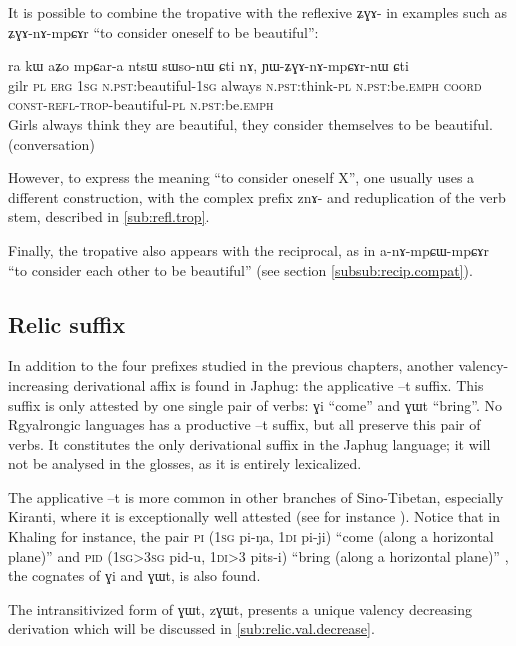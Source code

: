 \documentclass[oldfontcommands,oneside,a4paper,11pt]{memoir}
\newcommand{\ipa}[1]{{\phon #1}} %
\newcommand{\coord}{\textsc{coord}}
\newcommand{\const}{\textsc{const}}
\newcommand{\erg}{\textsc{erg}}
\newcommand{\emphat}{\textsc{emph}}
\newcommand{\npst}{\textsc{n.pst}}
\newcommand{\pl}{\textsc{pl}}
\newcommand{\refl}{\textsc{refl}}
\newcommand{\sg}{\textsc{sg}}
\newcommand{\trop}{\textsc{trop}}
\begin{document}
 It is possible to combine the tropative with the reflexive \ipa{ʑɣɤ-} in examples such as \ipa{ʑɣɤ-nɤ-mpɕɤr} ``to consider oneself to be beautiful'':
  \begin{exe}
\ex
\gll  \ipa{tɕhemɤpɯ} 	\ipa{ra} 	\ipa{kɯ} 	\ipa{aʑo} \ipa{mpɕar-a} 	\ipa{ntsɯ} 	\ipa{sɯso-nɯ} 	\ipa{ɕti} 	\ipa{nɤ,} 	\ipa{ɲɯ-ʑɣɤ-nɤ-mpɕɤr-nɯ} 	\ipa{ɕti} \\
gilr \pl{} \erg{} 1\sg{} \npst{}:beautiful-1\sg{} always \npst{}:think-\pl{} \npst{}:be.\emphat{} \coord{} \const{}-\refl{}-\trop{}-beautiful-\pl{}  \npst{}:be.\emphat{}\\
 \glt    Girls always think they are beautiful, they consider themselves to be beautiful. (conversation)
\end{exe} 
 
However, to express the meaning ``to consider oneself X'', one usually uses a different construction, with the complex prefix \ipa{znɤ-} and reduplication of the verb stem, described in \ref{sub:refl.trop}.

Finally, the tropative also appears with the reciprocal, as in \ipa{a-nɤ-mpɕɯ-mpɕɤr} ``to consider each other to be beautiful'' (see section \ref{subsub:recip.compat}).
  
\subsection{Relic suffix} \label{sub:applicative.t}
In addition to the four prefixes studied in the previous chapters, another valency-increasing derivational affix is found in Japhug: the applicative --\ipa{t} suffix. This suffix is only attested by one single pair of verbs: \ipa{ɣi} ``come'' and \ipa{ɣɯt} ``bring''. No Rgyalrongic languages has a productive --\ipa{t} suffix, but all preserve this pair of verbs. It constitutes the only derivational suffix in the Japhug language; it will not be analysed in the glosses, as it is entirely lexicalized.

The applicative --\ipa{t} is more common in other branches of Sino-Tibetan, especially  Kiranti, where it is exceptionally well attested (see for instance \citealt{michailovsky85dental}). Notice that in Khaling for instance, the pair \textsc{pi} (1\sg{} \ipa{pi-ŋa}, 1\textsc{di} \ipa{pi-ji}) ``come (along a horizontal plane)'' and \textsc{pid} (1\sg{}>3\sg{} \ipa{pid-u}, 1\textsc{di}>3 \ipa{pits-i}) ``bring (along a horizontal plane)'' , the cognates of \ipa{ɣi} and \ipa{ɣɯt}, is also found.
 
The intransitivized form of \ipa{ɣɯt}, \ipa{zɣɯt}, presents a unique valency decreasing derivation which will be discussed in \ref{sub:relic.val.decrease}.
\end{document}
